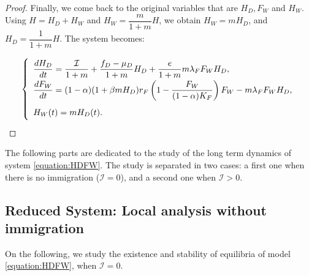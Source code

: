 \documentclass{article}
\newcommand{\lfw}{\lambda_{F}}
\newcommand{\lfw}{\lambda_{F}}
\newcommand{\cI}{\mathcal{I}}
\theoremstyle{definition}
\theoremstyle{remark}
\begin{document}
\begin{proof}
\medskip
Finally, we come back to the original variables that are $H_D, F_W$ and $H_W$. Using $H = H_D + H_W$ and $H_W = \dfrac{m}{1+m}H$, we obtain $H_W = m H_D$, and $H_D = \dfrac{1}{1+m}	H$. The system becomes:

\begin{equation*}
\def\arraystretch{2}
\left\lbrace \begin{array}{l}
\dfrac{dH_D}{dt} = \dfrac{\cI}{1+m} + \dfrac{f_D - \mu_D}{1+m} H_D + \dfrac{e}{1+m} m \lfw F_W H_D, \\
\dfrac{dF_W}{dt} = (1-\alpha) (1+\beta m H_D) r_F \left(1 - \dfrac{F_W}{(1-\alpha)K_F} \right) F_W - m \lfw F_WH_D, \\
H_W(t) = m H_D(t).
\end{array} \right.
\end{equation*}

\end{proof}

%

The following parts are dedicated to the study of the long term dynamics of system \eqref{equation:HDFW}. The study is separated in two cases: a first one when there is no immigration ($\cI = 0$), and a second one when $\cI > 0$.

\subsection{Reduced System: Local analysis without immigration}

On the following, we study the existence and stability of equilibria of model \eqref{equation:HDFW}, when $\cI = 0$.
\end{document}
